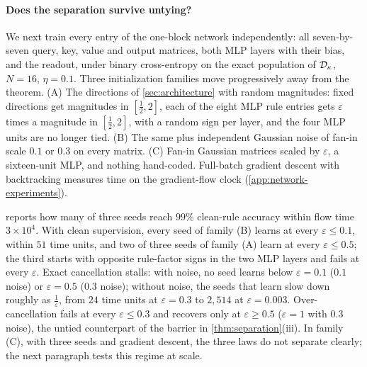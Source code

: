 \paragraph{Does the separation survive untying?}
We next train every entry of the one-block network independently: all seven-by-seven query, key, value and output matrices,
both MLP layers with their bias, and the readout, under binary cross-entropy on the exact population of $\mathcal D_{\kappa}$, $N=16$, $\eta=0.1$.
Three initialization families move progressively away from the theorem.
(A) The directions of \cref{sec:architecture} with random magnitudes: fixed directions get magnitudes in $[\tfrac{1}{2},2]$,
each of the eight MLP rule entries gets $\varepsilon$ times a magnitude in $[\tfrac{1}{2},2]$, with a random sign per layer, and the four MLP units are no longer tied.
(B) The same plus independent Gaussian noise of fan-in scale $0.1$ or $0.3$ on every matrix.
(C) Fan-in Gaussian matrices scaled by $\varepsilon$, a sixteen-unit MLP, and nothing hand-coded.
Full-batch gradient descent with backtracking measures time on the gradient-flow clock (\cref{app:network-experiments}).

 reports how many of three seeds reach $99\%$ clean-rule accuracy within flow time $3\times10^4$.
With clean supervision, every seed of family (B) learns at every $\varepsilon\le0.1$, within $51$ time units,
and two of three seeds of family (A) learn at every $\varepsilon\le0.5$; the third starts with opposite rule-factor signs in the two MLP layers and fails at every $\varepsilon$.
Exact cancellation stalls: with noise, no seed learns below $\varepsilon=0.1$ ($0.1$ noise) or $\varepsilon=0.5$ ($0.3$ noise);
without noise, the seeds that learn slow down roughly as $\tfrac{1}{\varepsilon}$, from $24$ time units at $\varepsilon=0.3$ to $2{,}514$ at $\varepsilon=0.003$.
Over-cancellation fails at every $\varepsilon\le0.3$ and recovers only at $\varepsilon\ge0.5$ ($\varepsilon=1$ with $0.3$ noise),
the untied counterpart of the barrier in \cref{thm:separation}(iii).
In family (C), with three seeds and gradient descent, the three laws do not separate clearly; the next paragraph tests this regime at scale.

